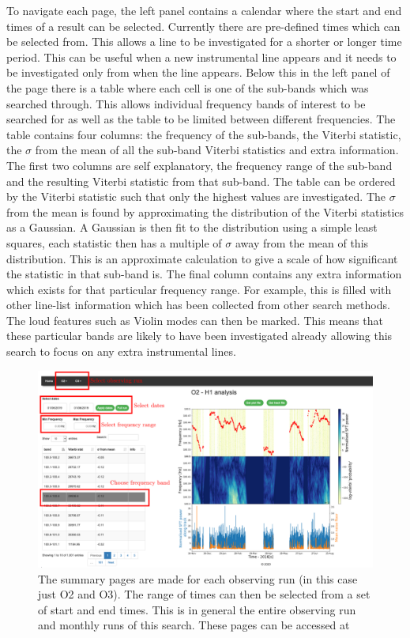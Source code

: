 To navigate each page, the left panel contains a calendar where the
start and end times of a result can be selected.  Currently there are
pre-defined times which can be selected from. This allows a line to be
investigated for a shorter or longer time period.  This can be useful when a
new instrumental line appears and it needs to be investigated only from when
the line appears.  Below this in the left panel of the page there is a table
where each cell is one of the sub-bands which was searched through. This allows
individual frequency bands of interest to be searched for as well as the table
to be limited between different frequencies.  The table contains four columns:
the frequency of the sub-bands, the Viterbi statistic, the $\sigma$ from the
mean of all the sub-band Viterbi statistics and extra information.  The first
two columns are self explanatory, the frequency range of the sub-band and the
resulting Viterbi statistic from that sub-band. The table can be ordered by the
Viterbi statistic such that only the highest values are investigated.  The
$\sigma$ from the mean is found by approximating the distribution of the
Viterbi statistics as a Gaussian.  A Gaussian is then fit to the distribution
using a simple least squares, each statistic then has a multiple of $\sigma$
away from the mean of this distribution.  This is an approximate calculation to
give a scale of how significant the statistic in that sub-band is.  The final
column contains any extra information which exists for that particular
frequency range.  For example, this is filled with other line-list information
which has been collected from other search methods.  The loud features such as
Violin modes can then be marked. This means that these particular bands are
likely to have been investigated already allowing this search to focus on any
extra instrumental lines.
%
\begin{figure}
	\centering
	\includegraphics[width=\textwidth]{C6_detchar/summary_annot.pdf}
	\caption[Example summary page for SOAP search]{The summary pages are made for each observing run (in this case just O2 and O3). The range of times can then be selected from a set of start and end times. This is in general the entire observing run and monthly runs of this search. These pages can be accessed at \citep{bayleyHome}}
	\label{detchar:summary:plots}
\end{figure}
%

